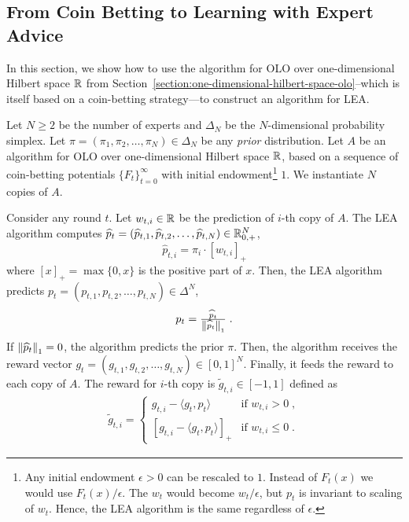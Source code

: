 \subsection{From Coin Betting to Learning with Expert Advice}
\label{section:reduction-experts}

In this section, we show how to use the algorithm for OLO over one-dimensional
Hilbert space $\mathbb{R}$ from
Section~\ref{section:one-dimensional-hilbert-space-olo}--which is itself based
on a coin-betting strategy---to construct an algorithm for \ac{LEA}.

Let $N \ge 2$ be the number of experts and $\Delta_N$ be the $N$-dimensional
probability simplex. Let $\pi = (\pi_1, \pi_2, \dots, \pi_N) \in \Delta_N$ be
any \emph{prior} distribution. Let $A$ be an algorithm for OLO over
one-dimensional Hilbert space $\mathbb{R}$, based on a sequence of coin-betting
potentials $\{F_t\}_{t=0}^\infty$ with initial endowment\footnote{Any initial
endowment $\epsilon > 0$ can be rescaled to $1$. Instead of $F_t(x)$ we would
use $F_t(x)/\epsilon$. The $w_t$ would become $w_t/\epsilon$, but $p_t$ is
invariant to scaling of $w_t$. Hence, the LEA algorithm is the same regardless
of $\epsilon$.} $1$. We instantiate $N$ copies of $A$.

Consider any round $t$. Let $w_{t,i} \in \mathbb{R}$ be the prediction of $i$-th copy of
$A$. The LEA algorithm computes $\widehat p_t = (\widehat p_{t,1}, \widehat
p_{t,2}, \dots, \widehat p_{t,N}) \in \mathbb{R}_{0,+}^N$,
\begin{equation}
\label{eq:phat}
\widehat p_{t,i} = \pi_i \cdot [w_{t,i}]_+
\end{equation}
where $[x]_+ = \max\{0,x\}$ is the positive part of $x$. Then, the LEA
algorithm predicts $p_t = (p_{t,1}, p_{t,2}, \dots, p_{t,N}) \in \Delta^N$,
\begin{equation}
\label{eq:preds_experts}
p_t = \tfrac{\widehat p_t}{\left\|{\widehat p_t}\right\|_1} \; .
\end{equation}
If $\left\|{\widehat p_t}\right\|_1 = 0$, the algorithm predicts the prior $\pi$.
Then, the algorithm receives the reward vector
$g_t = (g_{t,1}, g_{t,2}, \dots, g_{t,N}) \in [0,1]^N$. Finally, it
feeds the reward to each copy of $A$. The reward for $i$-th copy is $\widetilde g_{t,i} \in
[-1,1]$ defined as
\begin{align}
\label{eq:gradients_experts_reduction}
\widetilde g_{t,i} =
\begin{cases}
g_{t,i} - \langle g_t, p_t \rangle & \text{if } w_{t,i} > 0 \; , \\
\left[g_{t,i} - \langle g_t, p_t \rangle \right]_+ & \text{if } w_{t,i} \le 0 \; .
\end{cases}
\end{align}

